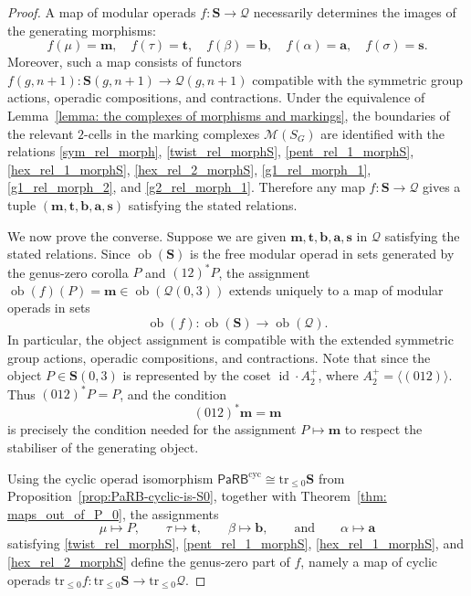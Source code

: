 \documentclass{amsart}
\newcommand{\calQ}{\mathcal{Q}}
\newcommand{\bS}{\mathbf{S}}
\newcommand{\calM}{\mathcal{M}}
\newcommand{\PaRB}{\mathsf{PaRB}}
\newcommand{\id}{\operatorname{id}}
\newcommand{\ob}{\operatorname{ob}}
\newcommand{\trun}[1]{\mathrm{tr}_{\leq{#1}}}
\theoremstyle{definition}
\numberwithin{equation}{section}
\begin{document}
\begin{proof}
A map of modular operads $f:\bS\to \calQ$ necessarily determines the images of the generating morphisms:
\[ f(\mu)=\mathbf{m},\quad f(\tau)=\mathbf{t},\quad f(\beta)=\mathbf{b},\quad f(\alpha)=\mathbf{a},\quad f(\sigma)=\mathbf{s}.
\]
Moreover, such a map consists of functors $f(g,n+1):\bS(g,n+1)\longrightarrow \calQ(g,n+1)$ compatible with the symmetric group actions, operadic compositions, and contractions. Under the equivalence of Lemma~\ref{lemma: the complexes of morphisms and markings}, the boundaries of the relevant $2$-cells in the marking complexes $\calM(S_G)$ are identified with the relations \eqref{sym_rel_morph}, \eqref{twist_rel_morphS}, \eqref{pent_rel_1_morphS}, \eqref{hex_rel_1_morphS}, \eqref{hex_rel_2_morphS}, \eqref{g1_rel_morph_1}, \eqref{g1_rel_morph_2}, and \eqref{g2_rel_morph_1}. Therefore any map $f:\bS\to\calQ$ gives a tuple $(\mathbf{m},\mathbf{t},\mathbf{b},\mathbf{a},\mathbf{s})$ satisfying the stated relations.

\medskip 

We now prove the converse. Suppose we are given $\mathbf{m},\mathbf{t},\mathbf{b},\mathbf{a},\mathbf{s}$ in $\calQ$ satisfying the stated relations.  Since $\ob(\bS)$ is the free modular operad in sets generated by the genus-zero corolla $P$ and $(12)^*P$, the assignment $\ob(f)(P)=\mathbf{m}\in\ob(\calQ(0,3))$ extends uniquely to a map of modular operads in sets
\[
\ob(f):\ob(\bS)\longrightarrow\ob(\calQ).
\]
In particular, the object assignment is compatible with the extended symmetric group actions, operadic compositions, and contractions.  Note that since the object $P\in \bS(0,3)$ is represented by the coset $\id\cdot A_2^+$, where $A_2^+=\langle(012)\rangle$. Thus $(012)^*P=P$, and the condition
\[
(012)^*\mathbf{m}=\mathbf{m}
\]
is precisely the condition needed for the assignment $P\mapsto \mathbf{m}$ to respect the stabiliser of the generating object.

\medskip

Using the cyclic operad isomorphism $\PaRB^{\mathrm{cyc}}\cong \trun{0}\bS$ from Proposition~\ref{prop:PaRB-cyclic-is-S0}, together with Theorem~\ref{thm: maps_out_of_P_0}, the assignments
\[
\mu\mapsto P,\qquad \tau\mapsto \mathbf{t},\qquad \beta\mapsto \mathbf{b},\qquad \text{and} \qquad \alpha\mapsto \mathbf{a}
\]
satisfying \eqref{twist_rel_morphS}, \eqref{pent_rel_1_morphS}, \eqref{hex_rel_1_morphS}, and \eqref{hex_rel_2_morphS} define the genus-zero
part of $f$, namely a map of cyclic operads $\trun{0}f:\trun{0}\bS\longrightarrow \trun{0}\calQ.$


\end{proof}
\end{document}
